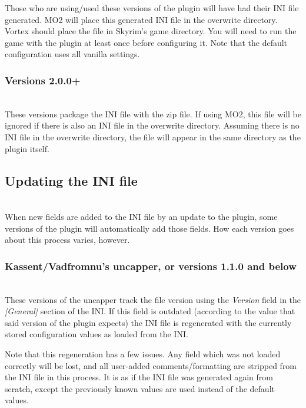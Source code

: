 \documentclass[12pt]{amsart}
\begin{document}
Those who are using/used these versions of the plugin will have had their
INI file generated. MO2 will place this generated INI file in the overwrite
directory. Vortex should place the file in Skyrim's game directory. You will
need to run the game with the plugin at least once before configuring it.
Note that the default configuration uses all vanilla settings.
\stopblock

\startblock
\subsubsection{Versions 2.0.0+}\hfill\\

These versions package the INI file with the zip file. If using MO2, this file
will be ignored if there is also an INI file in the overwrite directory.
Assuming there is no INI file in the overwrite directory, the file will appear
in the same directory as the plugin itself.
\stopblock

\startblock
\subsection{Updating the INI file}\hfill\\

When new fields are added to the INI file by an update to the plugin, some
versions of the plugin will automatically add those fields. How each version
goes about this process varies, however.
\stopblock

\startblock
\subsubsection{Kassent/Vadfromnu's uncapper, or versions 1.1.0 and below}\hfill\\

These versions of the uncapper track the file version using the \textit{Version}
field in the \textit{[General]} section of the INI. If this field is outdated
(according to the value that said version of the plugin expects) the INI file
is regenerated with the currently stored configuration values as loaded from
the INI.

Note that this regeneration has a few issues. Any field which was not loaded
correctly will be lost, and all user-added comments/formatting are stripped
from the INI file in this process. It is as if the INI file was generated again
from scratch, except the previously known values are used instead of the
default values.
\stopblock
\end{document}
